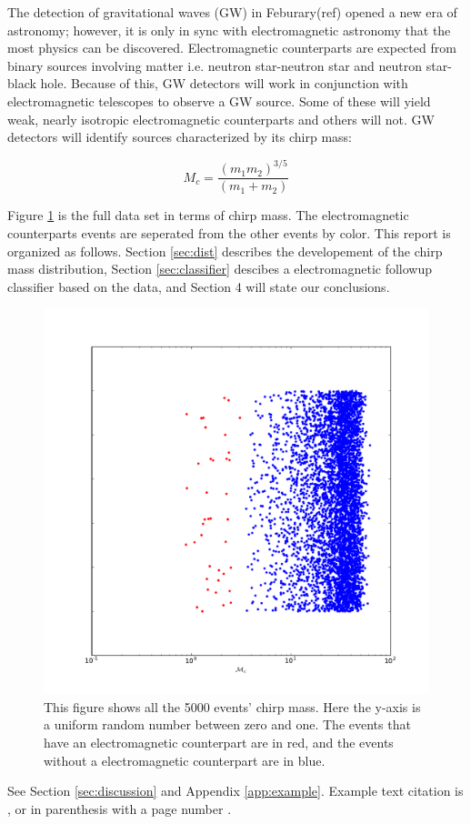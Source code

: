 The detection of gravitational waves (GW) in Feburary(ref) opened a new era of astronomy; however, it is only in sync with electromagnetic astronomy that the most physics can be discovered. Electromagnetic counterparts are expected from binary sources involving matter i.e. neutron star-neutron star and neutron star-black hole. Because of this, GW detectors will work in conjunction with electromagnetic telescopes to observe a GW source. Some of these will yield weak, nearly isotropic electromagnetic counterparts and others will not. GW detectors will identify sources characterized by its chirp mass:

\begin{equation}
\label{chirp_mass}
M_{c}=\frac{(m_{1}m_{2})^{3/5}}{(m_{1}+m_{2})}
\end{equation}

Figure \ref{fig:chirp} is the full data set in terms of chirp mass. The electromagnetic counterparts events are seperated from the other events by color. This report is organized as follows. Section \ref{sec:dist} describes the developement of the chirp mass distribution, Section \ref{sec:classifier} descibes a electromagnetic followup classifier based on the data, and Section 4 will state our conclusions.
\begin{figure}
\includegraphics[width=\columnwidth]{output/jake/chirp-mass-classes.pdf}
\caption{This figure shows all the 5000 events' chirp mass. Here the y-axis is a uniform random number between zero and one. The events that have an electromagnetic counterpart are in red, and the events without a electromagnetic counterpart are in blue.}
\label{fig:chirp}
\end{figure}
See Section \ref{sec:discussion} and Appendix \ref{app:example}. Example text citation is \textcite{2012ApJ...759...52D}, or in parenthesis with a page number \parencite[pg 2]{2012ApJ...759...52D}.

